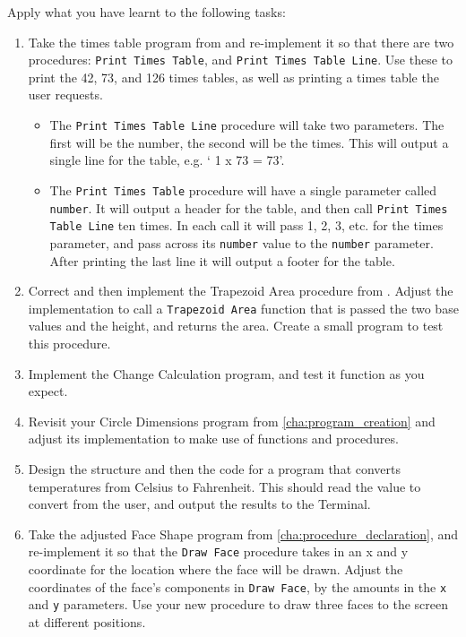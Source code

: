 Apply what you have learnt to the following tasks:
\begin{enumerate}
  \item Take the times table program from  and re-implement it so that there are two procedures: \texttt{Print Times Table}, and \texttt{Print Times Table Line}. Use these to print the 42, 73, and 126 times tables, as well as printing a times table the user requests.
  \begin{itemize}
    \item The \texttt{Print Times Table Line} procedure will take two parameters. The first will be the number, the second will be the times. This will output a single line for the table, e.g. ` 1 x 73 = 73'. 
    \item The \texttt{Print Times Table} procedure will have a single parameter called \texttt{number}. It will output a header for the table, and then call \texttt{Print Times Table Line} ten times. In each call it will pass 1, 2, 3, etc. for the times parameter, and pass across its \texttt{number} value to the \texttt{number} parameter. After printing the last line it will output a footer for the table.
  \end{itemize}
  \item Correct and then implement the Trapezoid Area procedure from . Adjust the implementation to call a \texttt{Trapezoid Area} function that is passed the two base values and the height, and returns the area. Create a small program to test this procedure.
  \item Implement the Change Calculation program, and test it function as you expect.
  \item Revisit your Circle Dimensions program from \cref{cha:program_creation} and adjust its implementation to make use of functions and procedures.
  \item Design the structure and then the code for a program that converts temperatures from Celsius to Fahrenheit. This should read the value to convert from the user, and output the results to the Terminal.
  \item Take the adjusted Face Shape program from \cref{cha:procedure_declaration}, and re-implement it so that the \texttt{Draw Face} procedure takes in an x and y coordinate for the location where the face will be drawn. Adjust the coordinates of the face's components in \texttt{Draw Face}, by the amounts in the \texttt{x} and \texttt{y} parameters. Use your new procedure to draw three faces to the screen at different positions.

\end{enumerate}
